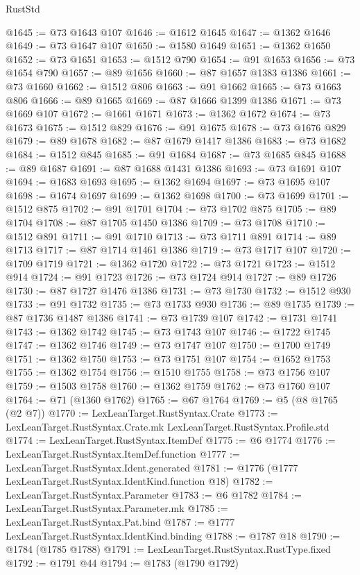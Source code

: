 \begin{lexlean}{RustStd}
\begin{coremodule}
@1645 := @73 @1643 @107
@1646 := @1612 @1645
@1647 := @1362 @1646
@1649 := @73 @1647 @107
@1650 := @1580 @1649
@1651 := @1362 @1650
@1652 := @73 @1651
@1653 := @1512 @790
@1654 := @91 @1653
@1656 := @73 @1654 @790
@1657 := @89 @1656
@1660 := @87 @1657 @1383 @1386
@1661 := @73 @1660
@1662 := @1512 @806
@1663 := @91 @1662
@1665 := @73 @1663 @806
@1666 := @89 @1665
@1669 := @87 @1666 @1399 @1386
@1671 := @73 @1669 @107
@1672 := @1661 @1671
@1673 := @1362 @1672
@1674 := @73 @1673
@1675 := @1512 @829
@1676 := @91 @1675
@1678 := @73 @1676 @829
@1679 := @89 @1678
@1682 := @87 @1679 @1417 @1386
@1683 := @73 @1682
@1684 := @1512 @845
@1685 := @91 @1684
@1687 := @73 @1685 @845
@1688 := @89 @1687
@1691 := @87 @1688 @1431 @1386
@1693 := @73 @1691 @107
@1694 := @1683 @1693
@1695 := @1362 @1694
@1697 := @73 @1695 @107
@1698 := @1674 @1697
@1699 := @1362 @1698
@1700 := @73 @1699
@1701 := @1512 @875
@1702 := @91 @1701
@1704 := @73 @1702 @875
@1705 := @89 @1704
@1708 := @87 @1705 @1450 @1386
@1709 := @73 @1708
@1710 := @1512 @891
@1711 := @91 @1710
@1713 := @73 @1711 @891
@1714 := @89 @1713
@1717 := @87 @1714 @1461 @1386
@1719 := @73 @1717 @107
@1720 := @1709 @1719
@1721 := @1362 @1720
@1722 := @73 @1721
@1723 := @1512 @914
@1724 := @91 @1723
@1726 := @73 @1724 @914
@1727 := @89 @1726
@1730 := @87 @1727 @1476 @1386
@1731 := @73 @1730
@1732 := @1512 @930
@1733 := @91 @1732
@1735 := @73 @1733 @930
@1736 := @89 @1735
@1739 := @87 @1736 @1487 @1386
@1741 := @73 @1739 @107
@1742 := @1731 @1741
@1743 := @1362 @1742
@1745 := @73 @1743 @107
@1746 := @1722 @1745
@1747 := @1362 @1746
@1749 := @73 @1747 @107
@1750 := @1700 @1749
@1751 := @1362 @1750
@1753 := @73 @1751 @107
@1754 := @1652 @1753
@1755 := @1362 @1754
@1756 := @1510 @1755
@1758 := @73 @1756 @107
@1759 := @1503 @1758
@1760 := @1362 @1759
@1762 := @73 @1760 @107
@1764 := @71 (@1360 @1762)
@1765 := @67 @1764
@1769 := @5 (@8 @1765 (@2 @7))
@1770 := LexLeanTarget.RustSyntax.Crate
@1773 := LexLeanTarget.RustSyntax.Crate.mk LexLeanTarget.RustSyntax.Profile.std
@1774 := LexLeanTarget.RustSyntax.ItemDef
@1775 := @6 @1774
@1776 := LexLeanTarget.RustSyntax.ItemDef.function
@1777 := LexLeanTarget.RustSyntax.Ident.generated
@1781 := @1776 (@1777 LexLeanTarget.RustSyntax.IdentKind.function @18)
@1782 := LexLeanTarget.RustSyntax.Parameter
@1783 := @6 @1782
@1784 := LexLeanTarget.RustSyntax.Parameter.mk
@1785 := LexLeanTarget.RustSyntax.Pat.bind
@1787 := @1777 LexLeanTarget.RustSyntax.IdentKind.binding
@1788 := @1787 @18
@1790 := @1784 (@1785 @1788)
@1791 := LexLeanTarget.RustSyntax.RustType.fixed
@1792 := @1791 @44
@1794 := @1783 (@1790 @1792)

\end{coremodule}
\end{lexlean}
